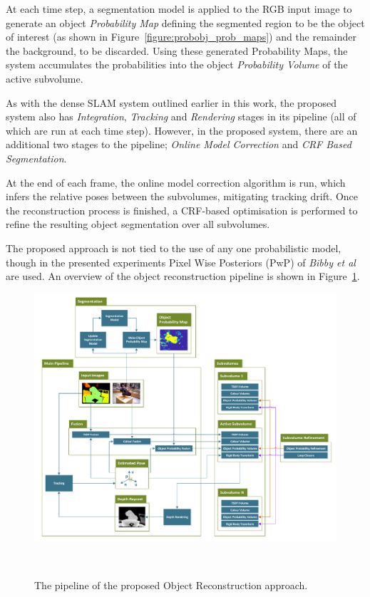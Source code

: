 At each time step, a segmentation model is applied to the RGB input image to
generate an object \textit{Probability Map} defining the segmented region to be
the object of interest (as shown in Figure~\ref{figure:probobj_prob_maps}) and the 
remainder the background, to be discarded. Using these generated Probability Maps, 
the system accumulates the probabilities into the object \textit{Probability Volume} 
of the active subvolume.

As with the dense SLAM system outlined earlier in this work, the proposed system
also has \textit{Integration}, \textit{Tracking} and \textit{Rendering}
stages in its pipeline (all of which are run at each time step). However, in
the proposed system, there are an additional two stages to the pipeline;
\textit{Online Model Correction} and \textit{CRF Based Segmentation}.

At the end of each frame, the online model correction algorithm is run, which
infers the relative poses between the subvolumes, mitigating tracking drift.
Once the reconstruction process is finished, a CRF-based optimisation is 
performed to refine the resulting object segmentation over all subvolumes.

The proposed approach is not tied to the use of any one probabilistic model,
though in the presented experiments Pixel Wise Posteriors (PwP) of \textit{Bibby et al} 
~\cite{Bibby2008} are used. An overview of the object reconstruction pipeline is shown in
Figure~\ref{figure:probobj_pipeline_diagram}.

\begin{figure}[!htbp]
  \centering
  \includegraphics[width=\linewidth]{figures/object_recon/pipeline.pdf}
  \caption[Probabilistic Object Reconstruction Pipeline]
  {The pipeline of the proposed Object Reconstruction approach.}
~\label{figure:probobj_pipeline_diagram}
\end{figure}

